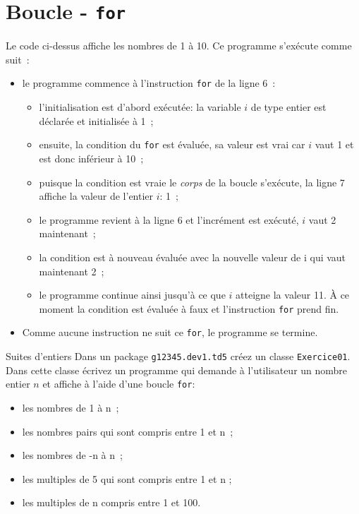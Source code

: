 \documentclass[a4paper,11pt]{style-esi/td}
\begin{document}
	
\section{Boucle - \texttt{for}}

	Le code ci-dessus affiche les nombres de 1 à 10.
	Ce programme s'exécute comme suit~:
	\begin{itemize}
		\item  le programme commence à l'instruction \texttt{for} de la ligne 6~:
			\begin{itemize}
				\item l'initialisation  est d'abord exécutée: 
					la variable $i$ de type entier est déclarée et initialisée à 1~;
				\item  ensuite, la condition du \texttt{for} 
					est évaluée, sa valeur est vrai car $i$ vaut 1 et est donc inférieur à 10~;
				\item puisque la condition est vraie le \emph{corps} de la boucle s'exécute, 
					la ligne 7 affiche la valeur de l'entier $i$: 1~;
				\item le programme revient à la ligne 6 et l'incrément  est exécuté, 
					$i$ vaut 2 maintenant~;
				\item la condition est à nouveau évaluée avec la nouvelle valeur de i qui vaut maintenant 2~;
				\item le programme continue ainsi jusqu'à ce que $i$ atteigne la valeur 11. 
					\`A ce moment la condition est évaluée à faux et l'instruction 
					\texttt{for} prend fin.
			\end{itemize}
		\item	Comme aucune instruction ne suit ce \texttt{for}, le programme se termine.

	\end{itemize}

 
	\begin{Exercice}{Suites d'entiers}	
		Dans un package \texttt{g12345.dev1.td5} créez un classe \texttt{Exercice01}.
		Dans cette classe écrivez un programme qui demande à l'utilisateur un nombre entier $n$ et affiche
		à l'aide d'une boucle \texttt{for}:
		\begin{itemize}
			\item  les nombres de 1 à n~;
			\item  les nombres pairs qui sont compris entre 1 et n~;
			\item les nombres de -n à n~;
			\item les multiples de 5 qui sont compris entre 1 et n ;
			\item les multiples de n compris entre 1 et 100.
		\end{itemize}
	\end{Exercice} 
 
\end{document}
